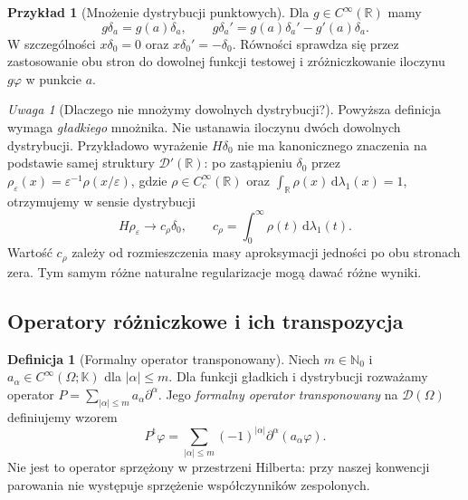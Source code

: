 \documentclass[11pt,a4paper]{article}
\numberwithin{equation}{section}
\theoremstyle{plain}
\theoremstyle{definition}
\newtheorem{definicja}[twierdzenie]{Definicja}
\newtheorem{przyklad}[twierdzenie]{Przykład}
\theoremstyle{remark}
\newtheorem{uwaga}[twierdzenie]{Uwaga}
\newcommand{\R}{\mathbb R}
\newcommand{\N}{\mathbb N}
\newcommand{\K}{\mathbb K}
\begin{document}
\begin{przyklad}[Mnożenie dystrybucji punktowych]
\label{ex:multiply-delta20}
Dla $g\in C^\infty(\R)$ mamy
\[
 g\delta_a=g(a)\delta_a,\qquad
 g\delta_a'=g(a)\delta_a'-g'(a)\delta_a.
\]
W szczególności $x\delta_0=0$ oraz $x\delta_0'=-\delta_0$.
Równości sprawdza się przez zastosowanie obu stron
do dowolnej funkcji testowej i zróżniczkowanie iloczynu
$g\varphi$ w punkcie $a$.
\end{przyklad}

\begin{uwaga}[Dlaczego nie mnożymy dowolnych dystrybucji?]
\label{rem:no-product20}
Powyższa definicja wymaga \emph{gładkiego} mnożnika.
Nie ustanawia iloczynu dwóch dowolnych dystrybucji.
Przykładowo wyrażenie $H\delta_0$ nie ma kanonicznego
znaczenia na podstawie samej struktury $\mathcal D'(\R)$:
po zastąpieniu $\delta_0$ przez
$\rho_\varepsilon(x)=\varepsilon^{-1}\rho(x/\varepsilon)$,
gdzie $\rho\in C_c^\infty(\R)$ oraz
$\int_\R\rho(x)\,\mathrm d\lambda_1(x)=1$,
otrzymujemy w sensie dystrybucji
\[
 H\rho_\varepsilon\longrightarrow c_\rho\delta_0,
 \qquad c_\rho=\int_0^\infty\rho(t)\,\mathrm d\lambda_1(t).
\]
Wartość $c_\rho$ zależy od rozmieszczenia masy
aproksymacji jedności po obu stronach zera.
Tym samym różne naturalne regularizacje mogą dawać różne wyniki.
\end{uwaga}

\subsection{Operatory różniczkowe i ich transpozycja}

\begin{definicja}[Formalny operator transponowany]
\label{def:formal-transpose20}
Niech $m\in\N_0$ i $a_\alpha\in C^\infty(\Omega;\K)$
dla $|\alpha|\le m$. Dla funkcji gładkich i dystrybucji
rozważamy operator $P=\sum_{|\alpha|\le m}a_\alpha\partial^\alpha$.
Jego \emph{formalny operator transponowany} na $\mathcal D(\Omega)$
definiujemy wzorem
\[
 P^{\mathrm t}\varphi=
 \sum_{|\alpha|\le m}(-1)^{|\alpha|}
 \partial^\alpha(a_\alpha\varphi).
\]
Nie jest to operator sprzężony w przestrzeni Hilberta:
przy naszej konwencji parowania nie występuje sprzężenie
współczynników zespolonych.
\end{definicja}
\end{document}
